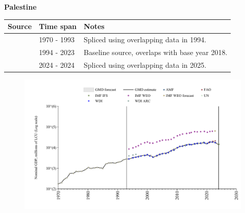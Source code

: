 \documentclass[12pt,a4paper,landscape]{article}
\begin{document}
\begin{adjustbox}{max totalsize={\paperwidth}{\paperheight},center}
\begin{minipage}[t][\textheight][t]{\textwidth}
\vspace*{0.5cm}
{}
\begin{center}
{\Large\bfseries Palestine}
\end{center}
\vspace{0.5cm}
\begin{table}[H]
\centering
\small
\begin{tabular}{|l|l|l|}
\hline
\textbf{Source} & \textbf{Time span} & \textbf{Notes} \\
\hline
\rowcolor{white}\cite{UN}& 1970 - 1993 &Spliced using overlapping data in 1994.\\
\rowcolor{lightgray}\cite{WDI}& 1994 - 2023 &Baseline source, overlaps with base year 2018.\\
\rowcolor{white}\cite{IMF_IFS}& 2024 - 2024 &Spliced using overlapping data in 2025.\\
\hline
\end{tabular}
\end{table}
\begin{figure}[H]
\centering
\includegraphics[width=\textwidth,height=0.6\textheight,keepaspectratio]{graphs/PSE_nGDP.pdf}
\end{figure}
\end{minipage}
\end{adjustbox}
\end{document}
